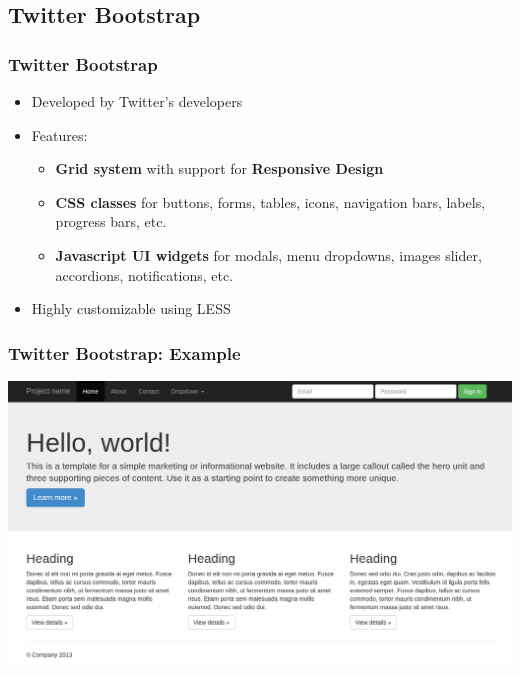 \documentclass{beamer}
\begin{document}
\subsection{Twitter Bootstrap}
\begin{frame}[fragile]\frametitle{Twitter Bootstrap} 

  \begin{itemize}
    \item Developed by Twitter's developers
    \item Features:
    \begin{itemize}
      \item \textbf{Grid system} with support for \textbf{Responsive Design}
      \item \textbf{CSS classes} for buttons, forms, tables, icons, navigation bars, labels, progress bars, etc.
      \item \textbf{Javascript UI widgets} for modals, menu dropdowns, images slider, accordions, notifications, etc.
    \end{itemize}
    \item Highly customizable using LESS
  \end{itemize}

\end{frame}




\begin{frame}[fragile]\frametitle{Twitter Bootstrap: Example} 

  \includegraphics[scale=0.28]{images/bootstrap_demo.png} 

\end{frame}




\end{document}
